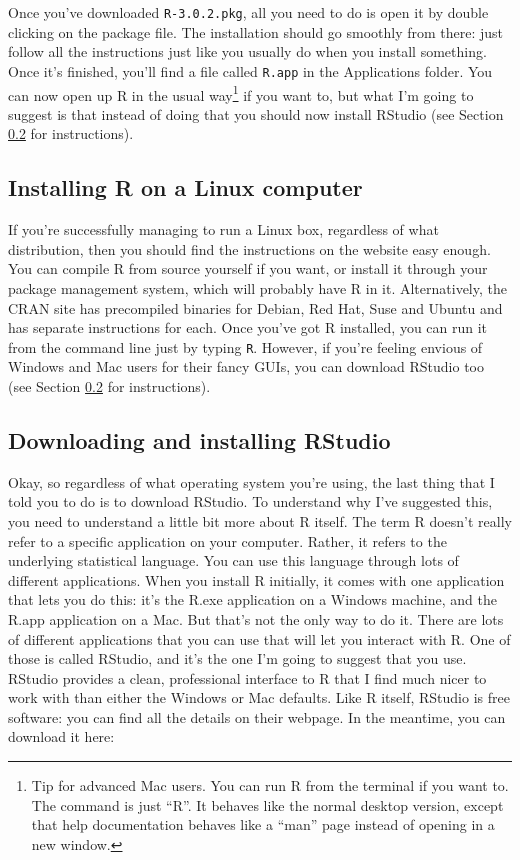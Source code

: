 \documentclass[
]{book}
\begin{document}
Once you've downloaded \texttt{R-3.0.2.pkg}, all you need to do is open it by double clicking on the package file. The installation should go smoothly from there: just follow all the instructions just like you usually do when you install something. Once it's finished, you'll find a file called \texttt{R.app} in the Applications folder. You can now open up R in the usual way\footnote{Tip for advanced Mac users. You can run R from the terminal if you want to. The command is just ``R''. It behaves like the normal desktop version, except that help documentation behaves like a ``man'' page instead of opening in a new window.} if you want to, but what I'm going to suggest is that instead of doing that you should now install RStudio (see Section \ref{installingrstudio} for instructions).

\hypertarget{installing-r-on-a-linux-computer}{%
\subsection{Installing R on a Linux computer}\label{installing-r-on-a-linux-computer}}

If you're successfully managing to run a Linux box, regardless of what distribution, then you should find the instructions on the website easy enough. You can compile R from source yourself if you want, or install it through your package management system, which will probably have R in it.
Alternatively, the CRAN site has precompiled binaries for Debian, Red Hat, Suse and Ubuntu and has separate instructions for each. Once you've got R installed, you can run it from the command line just by typing \texttt{R}. However, if you're feeling envious of Windows and Mac users for their fancy GUIs, you can download RStudio too (see Section \ref{installingrstudio} for instructions).

\hypertarget{installingrstudio}{%
\subsection{Downloading and installing RStudio}\label{installingrstudio}}

Okay, so regardless of what operating system you're using, the last thing that I told you to do is to download RStudio. To understand why I've suggested this, you need to understand a little bit more about R itself. The term R doesn't really refer to a specific application on your computer. Rather, it refers to the underlying statistical language. You can use this language through lots of different applications. When you install R initially, it comes with one application that lets you do this: it's the R.exe application on a Windows machine, and the R.app application on a Mac. But that's not the only way to do it. There are lots of different applications that you can use that will let you interact with R. One of those is called RStudio, and it's the one I'm going to suggest that you use. RStudio provides a clean, professional interface to R that I find much nicer to work with than either the Windows or Mac defaults. Like R itself, RStudio is free software: you can find all the details on their webpage. In the meantime, you can download it here:
\end{document}
